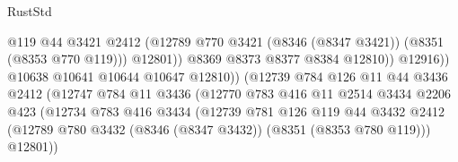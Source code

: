 \begin{lexlean}{RustStd}
\begin{coremodule}
                                              @119
                                              @44
                                              @3421
                                              @2412
                                              (@12789
                                                @770
                                                @3421
                                                (@8346 (@8347 @3421))
                                                (@8351 (@8353 @770 @119)))
                                              @12801))
                                          @8369
                                          @8373
                                          @8377
                                          @8384
                                          @12810))
                                      @12916))
                                  @10638
                                  @10641
                                  @10644
                                  @10647
                                  @12810))
                              (@12739
                                @784
                                @126
                                @11
                                @44
                                @3436
                                @2412
                                (@12747
                                  @784
                                  @11
                                  @3436
                                  (@12770
                                    @783
                                    @416
                                    @11
                                    @2514
                                    @3434
                                    @2206
                                    @423
                                    (@12734
                                      @783
                                      @416
                                      @3434
                                      (@12739
                                        @781
                                        @126
                                        @119
                                        @44
                                        @3432
                                        @2412
                                        (@12789
                                          @780
                                          @3432
                                          (@8346 (@8347 @3432))
                                          (@8351 (@8353 @780 @119)))
                                        @12801))

\end{coremodule}
\end{lexlean}
